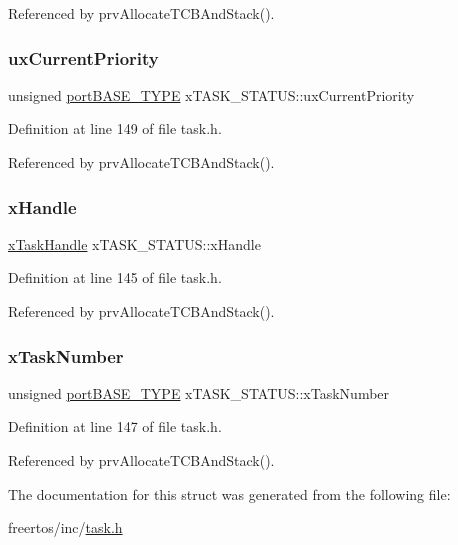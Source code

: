 Referenced by prv\+Allocate\+T\+C\+B\+And\+Stack().

\mbox{\label{structxTASK__STATUS_a381d967bd2222b5cb98efa708ae8a4d3}} 
\subsubsection{\texorpdfstring{ux\+Current\+Priority}{uxCurrentPriority}}
{\footnotesize\ttfamily unsigned \hyperlink{portmacro_8h_a1ebe82d24d764ae4e352f7c3a9f92c01}{port\+B\+A\+S\+E\+\_\+\+T\+Y\+PE} x\+T\+A\+S\+K\+\_\+\+S\+T\+A\+T\+U\+S\+::ux\+Current\+Priority}



Definition at line 149 of file task.\+h.



Referenced by prv\+Allocate\+T\+C\+B\+And\+Stack().

\mbox{\label{structxTASK__STATUS_a16b862ad7f2460c2575d14350b5e7270}} 
\subsubsection{\texorpdfstring{x\+Handle}{xHandle}}
{\footnotesize\ttfamily \hyperlink{task_8h_a271ae40d5db07d928a113766505a0965}{x\+Task\+Handle} x\+T\+A\+S\+K\+\_\+\+S\+T\+A\+T\+U\+S\+::x\+Handle}



Definition at line 145 of file task.\+h.



Referenced by prv\+Allocate\+T\+C\+B\+And\+Stack().

\mbox{\label{structxTASK__STATUS_a14a06c8bd78b7f60f9395593ac06b286}} 
\subsubsection{\texorpdfstring{x\+Task\+Number}{xTaskNumber}}
{\footnotesize\ttfamily unsigned \hyperlink{portmacro_8h_a1ebe82d24d764ae4e352f7c3a9f92c01}{port\+B\+A\+S\+E\+\_\+\+T\+Y\+PE} x\+T\+A\+S\+K\+\_\+\+S\+T\+A\+T\+U\+S\+::x\+Task\+Number}



Definition at line 147 of file task.\+h.



Referenced by prv\+Allocate\+T\+C\+B\+And\+Stack().



The documentation for this struct was generated from the following file\+:\begin{DoxyCompactItemize}
\item 
freertos/inc/\hyperlink{task_8h}{task.\+h}\end{DoxyCompactItemize}
